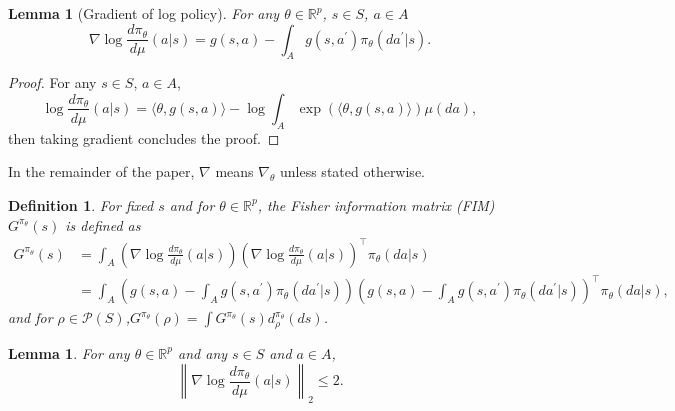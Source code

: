 \documentclass{amsart}
\newtheorem{lemma}[theorem]{Lemma}
\newtheorem{definition}{Definition}
\theoremstyle{definition}
\begin{document}
\begin{lemma}[Gradient of log policy]\label{lem:app:mdp:grad_of_log_policy}
For any $\theta \in \mathbb{R}^p$, $s \in S$, $a \in A$
\begin{equation}\label{eq:app:mdp:grad_of_log_policy}
\nabla \log\frac{d \pi_{\theta}}{d \mu}(a|s) = g(s,a) - \int_A g(s, a^\prime) \pi_{\theta}( da^\prime | s). 
\end{equation}
\end{lemma}
\begin{proof}
For any  $s \in S$, $a \in A$,
\[
\log\frac{d \pi_{\theta}}{d \mu}(a|s) = \langle\theta,g(s,a)\rangle - \log \int_A \exp\left(\langle\theta,g(s,a)\rangle\right)\mu(da),
\]
then taking gradient concludes the proof.
\end{proof}
In the remainder of the paper, $\nabla$ means $\nabla_\theta$ unless stated otherwise.
\begin{definition}\label{def:app:mdp:FIM}
For fixed $s$ and for $\theta \in \mathbb{R}^p$, the Fisher information matrix (FIM) $G^{\pi_\theta}(s)$ is defined as
\begin{align*}
G^{\pi_\theta}(s) & = \int_A \left(\nabla \log\frac{d \pi_{\theta}}{d \mu}(a|s) \right)\left(\nabla \log\frac{d \pi_{\theta}}{d \mu}(a|s)\right)^{\top}\pi_\theta(da|s)\\
& = \int_A \left(g(s,a) - \int_A g(s, a^\prime) \pi_\theta ( da^\prime | s) \right)\left(g(s,a) - \int_A g(s, a^\prime) \pi_\theta (da^\prime | s) \right)^{\top}\pi_\theta(da|s),
\end{align*}
and for $\rho \in \mathcal{P}(S)$,$G^{\pi_\theta}(\rho) = \int G^{\pi_\theta}(s) d_\rho^{\pi_\theta}(ds)$. 
\end{definition}

\begin{lemma}\label{lem:app:mdp:bounded_grad_of_log_policy}
For any $\theta \in \mathbb{R}^p$ and any $s \in S$ and $a \in A$,
\begin{equation}
\left\|\nabla \log\frac{d \pi_{\theta}}{d \mu} (a|s)\right\|_2 \leq 2.
\end{equation}
\end{lemma}
\end{document}
